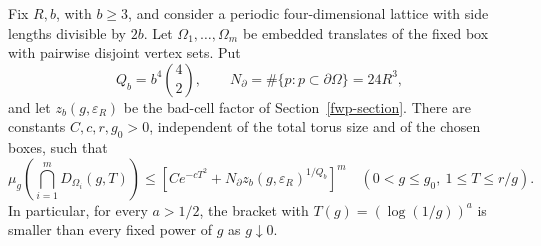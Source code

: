 \begin{theorem}
\label{fbb:boxes}
Fix \(R,b\), with \(b\geq3\), and consider a periodic four-dimensional
lattice with side lengths divisible by \(2b\). Let
\(\Omega_1,\ldots,\Omega_m\) be embedded translates of the fixed box
with pairwise disjoint vertex sets. Put
\[
 Q_b=b^4\binom42,\qquad
 N_\partial=\#\{p:p\subset\partial\Omega\}=24R^3,
\]
and let \(z_b(g,\varepsilon_R)\) be the bad-cell factor of
Section~\ref{fwp-section}. There are constants \(C,c,r,g_0>0\),
independent of the total torus size and of the chosen boxes, such
that
\begin{equation}
 \mu_g\left(\bigcap_{i=1}^m D_{\Omega_i}(g,T)\right)
 \leq \left[
       C e^{-cT^2}
       +N_\partial z_b(g,\varepsilon_R)^{1/Q_b}
       \right]^m
 \quad(0<g\leq g_0,\ 1\leq T\leq r/g).
 \label{fbb:joint}
\end{equation}
In particular, for every \(a>1/2\), the bracket with
\(T(g)=(\log(1/g))^a\) is smaller than every fixed power of \(g\)
as \(g\downarrow0\).
\end{theorem}
